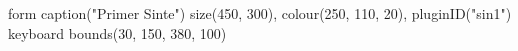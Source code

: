 form caption("Primer Sinte") size(450, 300), colour(250, 110, 20), pluginID("sin1")
keyboard bounds(30, 150, 380, 100)